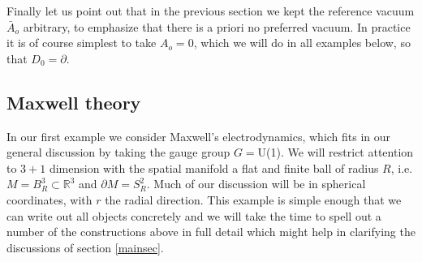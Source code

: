\documentclass[11pt,a4paper]{article}
\def\grad{{\partial}}
\begin{document}
    Finally let us point out that in the previous section we kept the reference vacuum $\bar A_o$ arbitrary, to emphasize that there is a priori no preferred vacuum. In practice it is of course simplest to take $A_o=0$, which we will do in all examples below, so that $D_0=\grad$.
    
        \subsection{Maxwell theory}
            In our first example we consider Maxwell's electrodynamics, which fits in our general discussion by taking the gauge group $G=$U(1). We will restrict attention to $3+1$ dimension with the spatial manifold a flat and finite ball of radius $R$, i.e. $M=B_R^3\subset\mathbb{R}^3$ and $\partial M=S^2_R$. Much of our discussion will be in spherical coordinates, with $r$ the radial direction. This example is simple enough that we can write out all objects concretely and we will take the time to spell out a number of the constructions above in full detail which might help in clarifying the discussions of section \ref{mainsec}.
            
\end{document}
